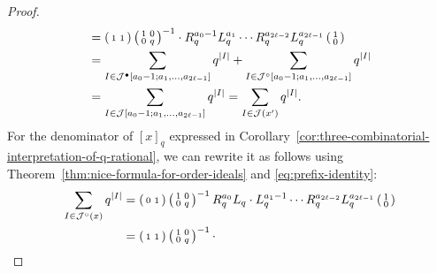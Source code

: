 \documentclass[a4paper,12pt]{amsart}
\newcommand{\xx}{{x}}
\newcommand{\Jcal}{{\mathcal{J}}}
\newcommand{\0}{\mathtt{0}}
\newcommand{\1}{\mathtt{1}}
\newcommand{\2}{\mathtt{2}}
\newcommand{\3}{\mathtt{3}}
\newcommand{\size}[1]{
    {|#1|}                 %
}
\begin{document}
\begin{proof}
\begin{align*}
        &=
        \left(\begin{smallmatrix} 1 & 1 \end{smallmatrix}\right)
        \left(\begin{smallmatrix} 1 & 0 \\ 0 & q \end{smallmatrix}\right)^{-1}
            \cdot
        R_q^{a_0-1}L_q^{a_1}\cdots R_q^{a_{2\ell-2}}L_q^{a_{2\ell-1}}
        \left(\begin{smallmatrix} 1 \\ 0 \end{smallmatrix}\right)\\
        &=
          \sum_{I\in \Jcal^\bullet[a_0-1;a_1,\dots,a_{2\ell-1}]} q^{\size{I}}
        + \sum_{I\in \Jcal^\circ[a_0-1;a_1,\dots,a_{2\ell-1}]} q^{\size{I}}\\
        &=
        \sum_{I\in \Jcal[a_0-1;a_1,\dots,a_{2\ell-1}]} q^{\size{I}}
        = \sum_{I\in \Jcal(\xx')} q^{\size{I}}.
    \end{align*}
    \endgroup
    For the denominator of $[\xx]_q$
    expressed in Corollary~\ref{cor:three-combinatorial-interpretation-of-q-rational},
    we can rewrite it as follows
    using Theorem~\ref{thm:nice-formula-for-order-ideals} and \eqref{eq:prefix-identity}:
    \begingroup
    \allowdisplaybreaks
    \begin{align*}
        \sum_{I\in \Jcal^\circ  (\xx)} q^{\size{I}}
        &=
        \left(\begin{smallmatrix} 0 & 1 \end{smallmatrix}\right)
        \left(\begin{smallmatrix} 1 & 0 \\ 0 & q \end{smallmatrix}\right)^{-1}
        R_q^{a_0}L_q\cdot
        L_q^{a_1-1}\cdots R_q^{a_{2\ell-2}}L_q^{a_{2\ell-1}}
        \left(\begin{smallmatrix} 1 \\ 0 \end{smallmatrix}\right)\\
        &=
        \left(\begin{smallmatrix} 1 & 1 \end{smallmatrix}\right)
        \left(\begin{smallmatrix} 1 & 0 \\ 0 & q \end{smallmatrix}\right)^{-1}
            \cdot

\end{align*}
\end{proof}
\end{document}
